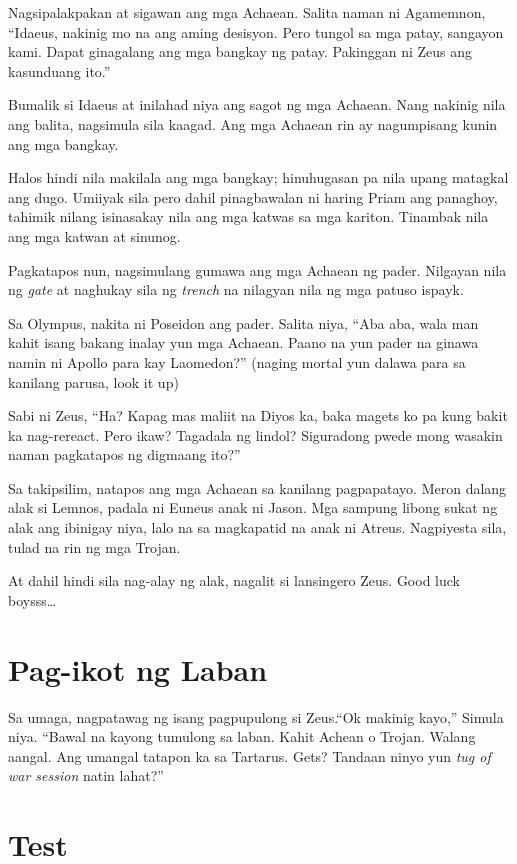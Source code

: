 \documentclass[12pt,letterpaper]{report}
\begin{document}
Nagsipalakpakan at sigawan ang mga Achaean. Salita naman ni Agamemnon, ``Idaeus, nakinig mo na ang aming desisyon. Pero tungol sa mga patay, sangayon kami. Dapat ginagalang ang mga bangkay ng patay. Pakinggan ni Zeus ang kasunduang ito.''

Bumalik si Idaeus at inilahad niya ang sagot ng mga Achaean. Nang nakinig nila ang balita, nagsimula sila kaagad. Ang mga Achaean rin ay nagumpisang kunin ang mga bangkay.

Halos hindi nila makilala ang mga bangkay; hinuhugasan pa nila upang matagkal ang dugo. Umiiyak sila pero dahil pinagbawalan ni haring Priam ang panaghoy, tahimik nilang isinasakay nila ang mga katwas sa mga kariton. Tinambak nila ang mga katwan at sinunog.

Pagkatapos nun, nagsimulang gumawa ang mga Achaean ng pader. Nilgayan nila ng \textit{gate} at naghukay sila ng \textit{trench} na nilagyan nila ng mga patuso ispayk.

Sa Olympus, nakita ni Poseidon ang pader. Salita niya, ``Aba aba, wala man kahit isang bakang inalay yun mga Achaean. Paano na yun pader na ginawa namin ni Apollo para kay Laomedon?'' (naging mortal yun dalawa para sa kanilang parusa, look it up)

Sabi ni Zeus, ``Ha? Kapag mas maliit na Diyos ka, baka magets ko pa kung bakit ka nag-rereact. Pero ikaw? Tagadala ng lindol? Siguradong pwede mong wasakin naman pagkatapos ng digmaang ito?''

Sa takipsilim, natapos ang mga Achaean sa kanilang pagpapatayo. Meron dalang alak si Lemnos, padala ni Euneus anak ni Jason. Mga sampung libong sukat ng alak ang ibinigay niya, lalo na sa magkapatid na anak ni Atreus. Nagpiyesta sila, tulad na rin ng mga Trojan.

At dahil hindi sila nag-alay ng alak, nagalit si lansingero Zeus. Good luck boysss\dots
\pagebreak
\chapter{Pag-ikot ng Laban}
Sa umaga, nagpatawag ng isang pagpupulong si Zeus.``Ok makinig kayo,'' Simula niya. ``Bawal na kayong tumulong sa laban. Kahit Achean o Trojan. Walang aangal. Ang umangal tatapon ka sa Tartarus. Gets? Tandaan ninyo yun \textit{tug of war session} natin lahat?''



\pagebreak
\chapter{Test}
\pagebreak
\end{document}
